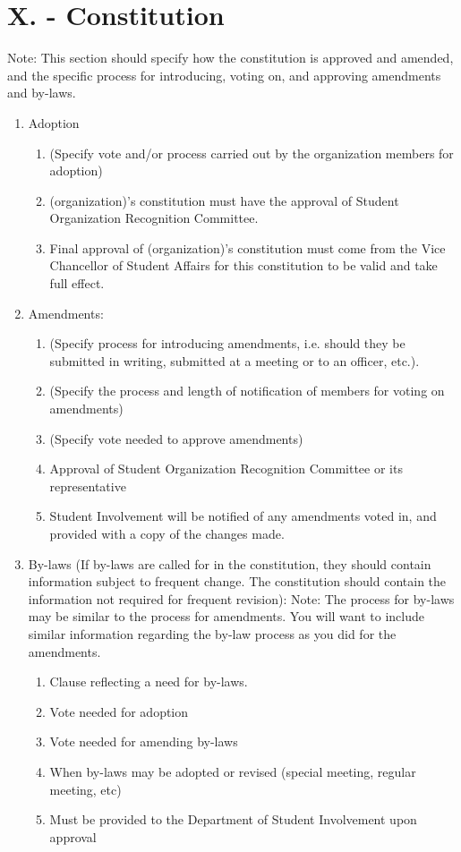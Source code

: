 
\section{X. - Constitution}
Note:  This section should specify how the constitution is approved and amended,
and the specific process for introducing, voting on, and approving amendments
and by-laws.
\begin{enumerate}
  \item Adoption
    \begin{enumerate}
      \item	(Specify vote and/or process carried out by the organization members
      for adoption)
      \item	(organization)’s constitution must have the approval of Student
      Organization Recognition Committee.
      \item	Final approval of (organization)’s constitution must come from the
      Vice Chancellor of Student Affairs for this constitution to be valid and
      take full effect.
    \end{enumerate}
  \item	Amendments:
    \begin{enumerate}
      \item	(Specify process for introducing amendments, i.e. should they be
      submitted in writing, submitted at a meeting or to an officer, etc.).
      \item	(Specify the process and length of notification of members for
      voting on amendments)
      \item	(Specify vote needed to approve amendments)
      \item	Approval of Student Organization Recognition Committee or its
      representative
      \item	Student Involvement will be notified of any amendments voted in, and
      provided with a copy of the changes made.
    \end{enumerate}
  \item	By-laws (If by-laws are called for in the constitution, they should
contain information subject to frequent change.  The constitution should contain
the information not required for frequent revision): Note:  The process for
by-laws may be similar to the process for amendments.  You will want to include
similar information regarding the by-law process as you did for the amendments.
    \begin{enumerate}
      \item	Clause reflecting a need for by-laws.
      \item	Vote needed for adoption
      \item	Vote needed for amending by-laws
      \item	When by-laws may be adopted or revised (special meeting, regular
      meeting, etc)
      \item	Must be provided to the Department of Student Involvement upon
      approval
    \end{enumerate}
\end{enumerate}

